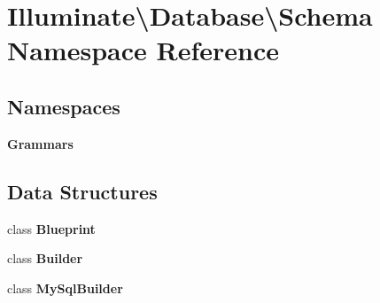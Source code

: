 \section{Illuminate\textbackslash{}Database\textbackslash{}Schema Namespace Reference}
\label{namespace_illuminate_1_1_database_1_1_schema}
\subsection*{Namespaces}
\begin{DoxyCompactItemize}
\item 
 {\bf Grammars}
\end{DoxyCompactItemize}
\subsection*{Data Structures}
\begin{DoxyCompactItemize}
\item 
class {\bf Blueprint}
\item 
class {\bf Builder}
\item 
class {\bf My\+Sql\+Builder}
\end{DoxyCompactItemize}
